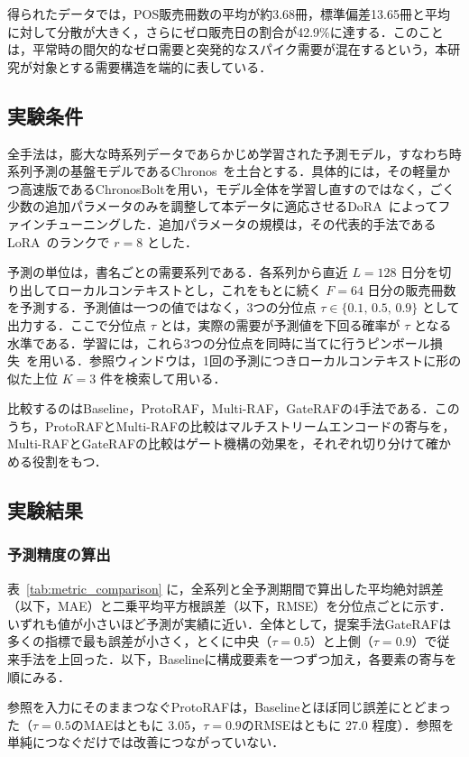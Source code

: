 \documentclass[twocolumn, lastpage]{jarticle}
\begin{document}
得られたデータでは，POS販売冊数の平均が約3.68冊，標準偏差13.65冊と平均に対して分散が大きく，さらにゼロ販売日の割合が42.9\%に達する．このことは，平常時の間欠的なゼロ需要と突発的なスパイク需要が混在するという，本研究が対象とする需要構造を端的に表している．


\subsection{実験条件}
全手法は，膨大な時系列データであらかじめ学習された予測モデル，すなわち時系列予測の基盤モデルであるChronos~\cite{Ansari.2024}を土台とする．具体的には，その軽量かつ高速版であるChronosBoltを用い，モデル全体を学習し直すのではなく，ごく少数の追加パラメータのみを調整して本データに適応させるDoRA~\cite{Liu.2024}によってファインチューニングした．追加パラメータの規模は，その代表的手法であるLoRA~\cite{Hu.2022}のランクで $r=8$ とした．

予測の単位は，書名ごとの需要系列である．各系列から直近 $L=128$ 日分を切り出してローカルコンテキストとし，これをもとに続く $F=64$ 日分の販売冊数を予測する．予測値は一つの値ではなく，3つの分位点 $\tau \in \{0.1,\, 0.5,\, 0.9\}$ として出力する．ここで分位点 $\tau$ とは，実際の需要が予測値を下回る確率が $\tau$ となる水準である．学習には，これら3つの分位点を同時に当てに行うピンボール損失~\cite{Koenker.1978}を用いる．参照ウィンドウは，1回の予測につきローカルコンテキストに形の似た上位 $K=3$ 件を検索して用いる．

比較するのはBaseline，ProtoRAF，Multi-RAF，GateRAFの4手法である．このうち，ProtoRAFとMulti-RAFの比較はマルチストリームエンコードの寄与を，Multi-RAFとGateRAFの比較はゲート機構の効果を，それぞれ切り分けて確かめる役割をもつ．

\subsection{実験結果}
\subsubsection{予測精度の算出}
表~\ref{tab:metric_comparison} に，全系列と全予測期間で算出した平均絶対誤差（以下，MAE）と二乗平均平方根誤差（以下，RMSE）を分位点ごとに示す．いずれも値が小さいほど予測が実績に近い．全体として，提案手法GateRAFは多くの指標で最も誤差が小さく，とくに中央（$\tau=0.5$）と上側（$\tau=0.9$）で従来手法を上回った．以下，Baselineに構成要素を一つずつ加え，各要素の寄与を順にみる．

参照を入力にそのままつなぐProtoRAFは，Baselineとほぼ同じ誤差にとどまった（$\tau=0.5$のMAEはともに $3.05$，$\tau=0.9$のRMSEはともに $27.0$ 程度）．参照を単純につなぐだけでは改善につながっていない．
\end{document}
